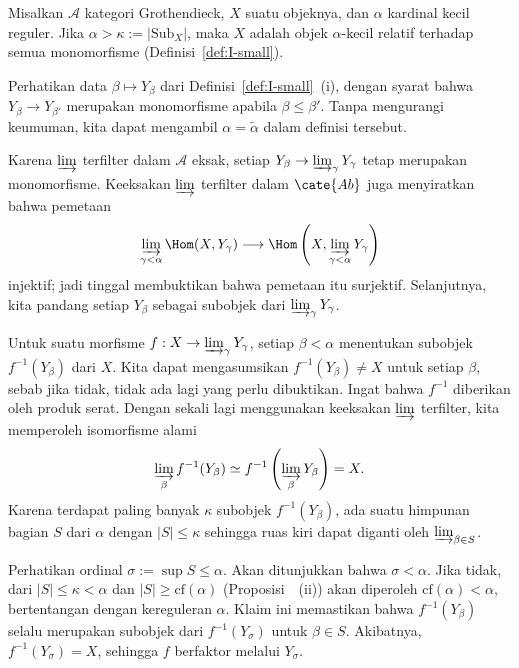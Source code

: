 \begin{lema}\label{prop:alpha-small}
Misalkan $\mathcal{A}$ kategori Grothendieck, $X$ suatu objeknya, dan $\alpha$
kardinal kecil reguler. Jika $\alpha>\kappa:=|\mathrm{Sub}_X|$, maka $X$
adalah objek $\alpha$-kecil relatif terhadap semua monomorfisme
(Definisi~\ref{def:I-small}).
\end{lema}
\begin{bukti}
Perhatikan data $\beta\mapsto Y_\beta$ dari Definisi~\ref{def:I-small}~(i),
dengan syarat bahwa $Y_\beta\to Y_{\beta'}$ merupakan monomorfisme apabila
$\beta\leq\beta'$. Tanpa mengurangi keumuman, kita dapat mengambil
$\alpha=\widetilde{\alpha}$ dalam definisi tersebut.

Karena $\varinjlim$ terfilter dalam $\mathcal{A}$ eksak, setiap
$Y_\beta\to\varinjlim_\gamma Y_\gamma$ tetap merupakan monomorfisme.
Keeksakan $\varinjlim$ terfilter dalam $\cate{Ab}$ juga menyiratkan bahwa
pemetaan
\[
\varinjlim_{\gamma<\alpha}\Hom(X,Y_\gamma)
\longrightarrow\Hom\left(X,\varinjlim_{\gamma<\alpha}Y_\gamma\right)
\]
injektif;
jadi tinggal membuktikan bahwa pemetaan itu surjektif. Selanjutnya, kita
pandang setiap $Y_\beta$ sebagai subobjek dari
$\varinjlim_\gamma Y_\gamma$.

Untuk suatu morfisme $f:X\to\varinjlim_\gamma Y_\gamma$, setiap
$\beta<\alpha$ menentukan subobjek $f^{-1}(Y_\beta)$ dari $X$. Kita dapat
mengasumsikan $f^{-1}(Y_\beta)\neq X$ untuk setiap $\beta$, sebab jika tidak,
tidak ada lagi yang perlu dibuktikan. Ingat bahwa $f^{-1}$ diberikan oleh
produk serat. Dengan sekali lagi menggunakan keeksakan $\varinjlim$
terfilter, kita memperoleh isomorfisme alami
\[\varinjlim_\beta f^{-1}(Y_\beta)
\simeq f^{-1}\left(\varinjlim_\beta Y_\beta\right)=X.\]
Karena terdapat paling banyak $\kappa$ subobjek $f^{-1}(Y_\beta)$, ada suatu
himpunan bagian $S$ dari $\alpha$ dengan $|S|\leq\kappa$ sehingga ruas kiri
dapat diganti oleh $\varinjlim_{\beta\in S}$.

Perhatikan ordinal $\sigma:=\sup S\leq\alpha$. Akan ditunjukkan bahwa
$\sigma<\alpha$. Jika tidak, dari $|S|\leq\kappa<\alpha$ dan
$|S|\geq\mathrm{cf}(\alpha)$
(Proposisi~~(ii)) akan
diperoleh $\mathrm{cf}(\alpha)<\alpha$, bertentangan dengan kereguleran
$\alpha$. Klaim ini memastikan bahwa $f^{-1}(Y_\beta)$ selalu merupakan
subobjek dari $f^{-1}(Y_\sigma)$ untuk $\beta\in S$. Akibatnya,
$f^{-1}(Y_\sigma)=X$, sehingga $f$ berfaktor melalui $Y_\sigma$.
\end{bukti}

